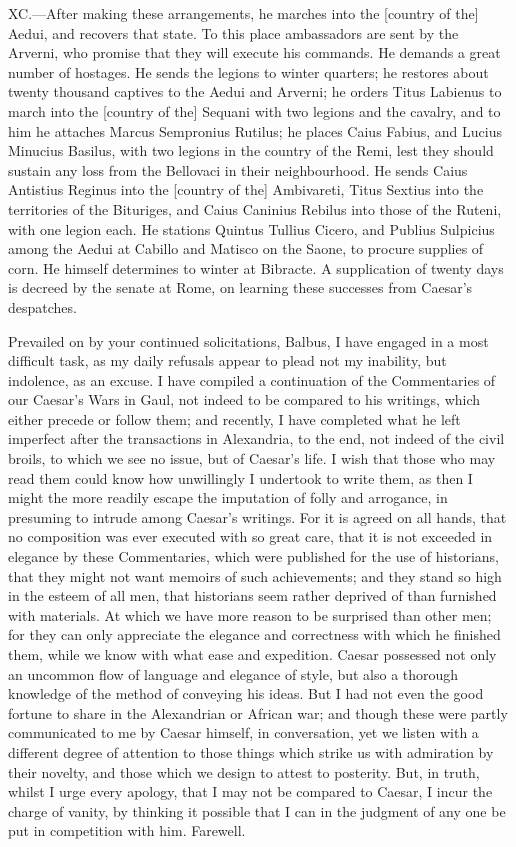 XC.—After making these arrangements, he marches into the [country of
the] Aedui, and recovers that state. To this place ambassadors are sent
by the Arverni, who promise that they will execute his commands. He
demands a great number of hostages. He sends the legions to winter
quarters; he restores about twenty thousand captives to the Aedui and
Arverni; he orders Titus Labienus to march into the [country of the]
Sequani with two legions and the cavalry, and to him he attaches Marcus
Sempronius Rutilus; he places Caius Fabius, and Lucius Minucius Basilus,
with two legions in the country of the Remi, lest they should sustain
any loss from the Bellovaci in their neighbourhood. He sends Caius
Antistius Reginus into the [country of the] Ambivareti, Titus Sextius
into the territories of the Bituriges, and Caius Caninius Rebilus into
those of the Ruteni, with one legion each. He stations Quintus Tullius
Cicero, and Publius Sulpicius among the Aedui at Cabillo and Matisco on
the Saone, to procure supplies of corn. He himself determines to winter
at Bibracte. A supplication of twenty days is decreed by the senate at
Rome, on learning these successes from Caesar's despatches.


Prevailed on by your continued solicitations, Balbus, I have engaged in
a most difficult task, as my daily refusals appear to plead not my
inability, but indolence, as an excuse. I have compiled a continuation
of the Commentaries of our Caesar's Wars in Gaul, not indeed to be
compared to his writings, which either precede or follow them; and
recently, I have completed what he left imperfect after the transactions
in Alexandria, to the end, not indeed of the civil broils, to which we
see no issue, but of Caesar's life. I wish that those who may read them
could know how unwillingly I undertook to write them, as then I might
the more readily escape the imputation of folly and arrogance, in
presuming to intrude among Caesar's writings. For it is agreed on all
hands, that no composition was ever executed with so great care, that it
is not exceeded in elegance by these Commentaries, which were published
for the use of historians, that they might not want memoirs of such
achievements; and they stand so high in the esteem of all men, that
historians seem rather deprived of than furnished with materials. At
which we have more reason to be surprised than other men; for they can
only appreciate the elegance and correctness with which he finished
them, while we know with what ease and expedition. Caesar possessed not
only an uncommon flow of language and elegance of style, but also a
thorough knowledge of the method of conveying his ideas. But I had not
even the good fortune to share in the Alexandrian or African war; and
though these were partly communicated to me by Caesar himself, in
conversation, yet we listen with a different degree of attention to
those things which strike us with admiration by their novelty, and those
which we design to attest to posterity. But, in truth, whilst I urge
every apology, that I may not be compared to Caesar, I incur the charge
of vanity, by thinking it possible that I can in the judgment of any one
be put in competition with him. Farewell.

